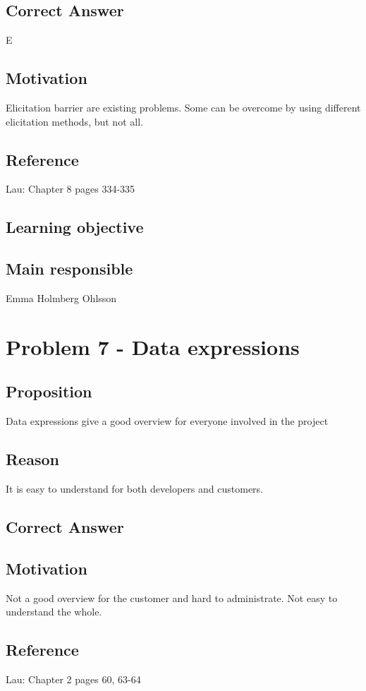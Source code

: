 \documentclass[a4paper]{article}
\begin{document}
\subsection{Correct Answer}
E
\subsection{Motivation}
Elicitation barrier are existing problems. Some can be overcome by using different elicitation methods, but not all.
\subsection{Reference}
Lau: Chapter 8 pages 334-335
\subsection{Learning objective}

\subsection{Main responsible}
Emma Holmberg Ohlsson


\section{Problem 7 - Data expressions}
\subsection{Proposition}
Data expressions give a good overview for everyone involved in the project
\subsection{Reason}
It is easy to understand for  both developers and customers. 
\subsection{Correct Answer}

\subsection{Motivation}
Not a good overview for the customer and hard to administrate. Not easy to understand the whole.
\subsection{Reference}
Lau: Chapter 2 pages 60, 63-64
\end{document}
